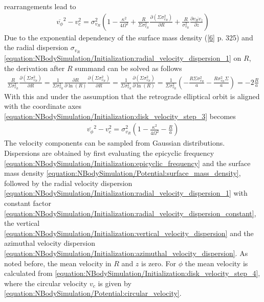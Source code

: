 \documentclass[letterpaper,10pt,english]{sphinxmanual}
\begin{document}
\sphinxAtStartPar
rearrangements lead to
\begin{equation}\label{equation:NBodySimulation/Initialization:disk_velocity_step_3}
\begin{split}\overline{v_\phi}^2 - v_c^2 = \sigma_{v_{R}}^2
\left (
1 - \frac{\kappa^2}{4\Omega^2} +
\frac{R}{\Sigma \sigma_{v_{R}}^2 } \frac{\partial \left ( \Sigma \sigma_{v_{R}}^2 \right ) }{\partial R}
+ \frac{R}{\sigma_{v_{R}}^2} \frac{\partial \overline{v_Rv_z}}{\partial z}
\right )\end{split}
\end{equation}
\sphinxAtStartPar
Due to the exponential dependency of the surface mass density ({[}\hyperlink{cite.NBodySimulation/Appendix:id17}{6}{]} p. 325)
and the radial dispersion \(\sigma_{v_{R}}\) \eqref{equation:NBodySimulation/Initialization:radial_velocity_dispersion_1} on \(R\), the derivation after \(R\) summand can be solved as follows
\begin{equation*}
\begin{split}\frac{R}{\Sigma \sigma_{v_{R}}^2 } \frac{\partial \left ( \Sigma \sigma_{v_{R}}^2 \right ) }{\partial R} =
\frac{1}{\Sigma \sigma_{v_{R}}^2 } \frac{\partial R }{\partial \ln(R)}\frac{\partial \left ( \Sigma \sigma_{v_{R}}^2 \right ) }{\partial R} =
\frac{1}{\Sigma \sigma_{v_{R}}^2 } \frac{\partial \left ( \Sigma \sigma_{v_{R}}^2 \right ) }{\partial \ln(R)} =
\frac{1}{\Sigma \sigma_{v_{R}}^2 }
\left ( - \frac{R\Sigma\sigma_{v_{R}}^2}{a}
- \frac{R\sigma_{v_{R}}^2\Sigma}{a}
\right ) = - 2 \frac{R}{a}\end{split}
\end{equation*}
\sphinxAtStartPar
With this and under the assumption that the retrograde elliptical orbit is aligned with the coordinate axes \eqref{equation:NBodySimulation/Initialization:disk_velocity_step_3} becomes
\begin{equation}\label{equation:NBodySimulation/Initialization:disk_velocity_step_4}
\begin{split}\overline{v_\phi}^2 - v_c^2 = \sigma_{v_{R}}^2
\left (1 - \frac{\kappa^2}{4\Omega^2} -\frac{R}{a } \right )\end{split}
\end{equation}
\sphinxAtStartPar
The velocity components can be sampled from Gaussian distributions. Dispersions are obtained by first evaluating the epicyclic frequency \eqref{equation:NBodySimulation/Initialization:epicyclic_frequency} and the surface mass density \eqref{equation:NBodySimulation/Potential:surface_mass_density},
followed by the radial velocity dispersion \eqref{equation:NBodySimulation/Initialization:radial_velocity_dispersion_1} with constant factor \eqref{equation:NBodySimulation/Initialization:radial_velocity_dispersion_constant}, the vertical \eqref{equation:NBodySimulation/Initialization:vertical_velocity_dispersion} and the azimuthal velocity dispersion \eqref{equation:NBodySimulation/Initialization:azimuthal_velocity_dispersion}.
As noted before, the mean velocity in \(R\) and \(z\) is zero. For \(\phi\) the mean velocity is calculated from \eqref{equation:NBodySimulation/Initialization:disk_velocity_step_4}, where the circular velocity \(v_c\) is given by \eqref{equation:NBodySimulation/Potential:circular_velocity}.
\end{document}
